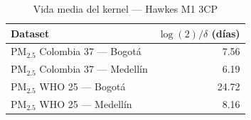 \begin{table}[htbp]
\centering
\caption{Vida media del kernel --- Hawkes M1 3CP}
\label{tab:hawkes_halflife_3cp}
\begin{tabular}{lr}
\toprule
Dataset & $\log(2)/\delta$ (d\'{i}as) \\
\midrule
PM$_{2.5}$ Colombia 37 --- Bogot\'{a} & 7.56 \\
PM$_{2.5}$ Colombia 37 --- Medell\'{i}n & 6.19 \\
PM$_{2.5}$ WHO 25 --- Bogot\'{a} & 24.72 \\
PM$_{2.5}$ WHO 25 --- Medell\'{i}n & 8.16 \\
\bottomrule
\end{tabular}
\end{table}

